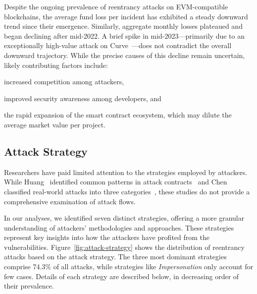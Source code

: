 Despite the ongoing prevalence of reentrancy attacks on EVM-compatible blockchains, the average fund loss per incident has exhibited a steady downward trend since their emergence. Similarly, aggregate monthly losses plateaued and began declining after mid-2022. A brief spike in mid-2023—primarily due to an exceptionally high-value attack on Curve~\cite{attack-report:curve}—does not contradict the overall downward trajectory. While the precise causes of this decline remain uncertain, likely contributing factors include:
\begin{enumerate*}
    \item increased competition among attackers, 
    \item improved security awareness among developers, and 
    \item the rapid expansion of the smart contract ecosystem, which may dilute the average market value per project.
\end{enumerate*}

\vspace{-0.5mm}




\subsection{Attack Strategy}
\label{quantitative:attack-strategy}

Researchers have paid limited attention to the strategies employed by attackers. 
While Huang \etal~identified common patterns in attack contracts~\cite{attack-contract-detection} and Chen \etal~ classified real-world attacks into three categories~\cite{turn-the-rudder}, these studies do not provide a comprehensive examination of attack flows.

In our analyses, we identified seven distinct strategies, offering a more granular understanding of attackers' methodologies and approaches. These strategies represent key insights into how the attackers have profited from the vulnerabilities. Figure~\ref{fig:attack-strategy} shows the distribution of reentrancy attacks based on the attack strategy. The three most dominant strategies comprise 74.3\% of all attacks, while strategies like \textit{Impersonation} only account for few cases. Details of each strategy are described below, in decreasing order of their prevalence. 

